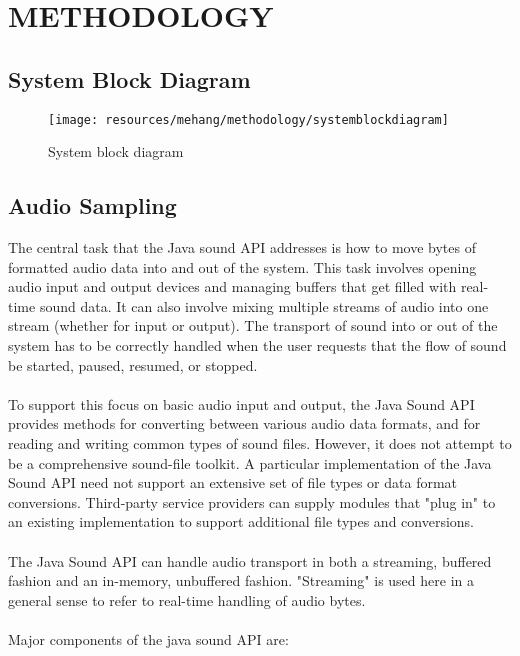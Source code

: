 \newpage
\section{METHODOLOGY}

\subsection{System Block Diagram}

\begin{figure}[h!]
        \centering
        \texttt{[image: resources/mehang/methodology/systemblockdiagram]}
        \caption{System block diagram}
\end{figure}

\subsection{Audio Sampling}
The central task that the Java sound API addresses is how to move bytes of formatted audio data into and out of the system. This task involves opening audio input and output devices and managing buffers that get filled with real-time sound data. It can also involve mixing multiple streams of audio into one stream (whether for input or output). The transport of sound into or out of the system has to be correctly handled when the user requests that the flow of sound be started, paused, resumed, or stopped.\\
\\
To support this focus on basic audio input and output, the Java Sound API provides methods for converting between various audio data formats, and for reading and writing common types of sound files. However, it does not attempt to be a comprehensive sound-file toolkit. A particular implementation of the Java Sound API need not support an extensive set of file types or data format conversions. Third-party service providers can supply modules that "plug in" to an existing implementation to support additional file types and conversions.\\
\\
The Java Sound API can handle audio transport in both a streaming, buffered fashion and an in-memory, unbuffered fashion. "Streaming" is used here in a general sense to refer to real-time handling of audio bytes.\\
\\
Major components of the java sound API are:

